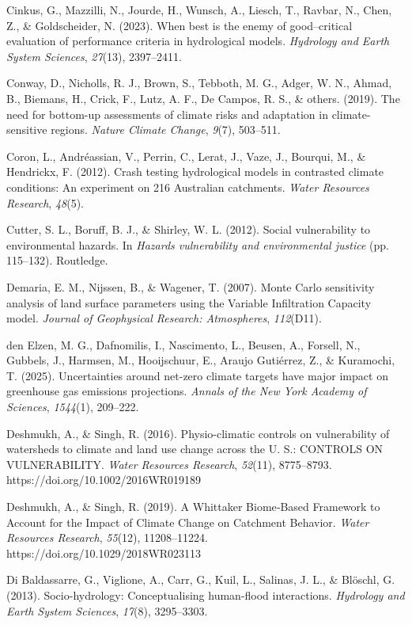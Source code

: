 \documentclass[
]{article}
\begin{document}
Cinkus, G., Mazzilli, N., Jourde, H., Wunsch, A., Liesch, T., Ravbar,
N., Chen, Z., \& Goldscheider, N. (2023). When best is the enemy of
good--critical evaluation of performance criteria in hydrological
models. \emph{Hydrology and Earth System Sciences}, \emph{27}(13),
2397--2411.

Conway, D., Nicholls, R. J., Brown, S., Tebboth, M. G., Adger, W. N.,
Ahmad, B., Biemans, H., Crick, F., Lutz, A. F., De Campos, R. S., \&
others. (2019). The need for bottom-up assessments of climate risks and
adaptation in climate-sensitive regions. \emph{Nature Climate Change},
\emph{9}(7), 503--511.

Coron, L., Andréassian, V., Perrin, C., Lerat, J., Vaze, J., Bourqui,
M., \& Hendrickx, F. (2012). Crash testing hydrological models in
contrasted climate conditions: An experiment on 216 Australian
catchments. \emph{Water Resources Research}, \emph{48}(5).

Cutter, S. L., Boruff, B. J., \& Shirley, W. L. (2012). Social
vulnerability to environmental hazards. In \emph{Hazards vulnerability
and environmental justice} (pp. 115--132). Routledge.

Demaria, E. M., Nijssen, B., \& Wagener, T. (2007). Monte Carlo
sensitivity analysis of land surface parameters using the Variable
Infiltration Capacity model. \emph{Journal of Geophysical Research:
Atmospheres}, \emph{112}(D11).

den Elzen, M. G., Dafnomilis, I., Nascimento, L., Beusen, A., Forsell,
N., Gubbels, J., Harmsen, M., Hooijschuur, E., Araujo Gutiérrez, Z., \&
Kuramochi, T. (2025). Uncertainties around net-zero climate targets have
major impact on greenhouse gas emissions projections. \emph{Annals of
the New York Academy of Sciences}, \emph{1544}(1), 209--222.

Deshmukh, A., \& Singh, R. (2016). Physio-climatic controls on
vulnerability of watersheds to climate and land use change across the U.
S.: CONTROLS ON VULNERABILITY. \emph{Water Resources Research},
\emph{52}(11), 8775--8793. https://doi.org/10.1002/2016WR019189

Deshmukh, A., \& Singh, R. (2019). A Whittaker Biome‐Based Framework to
Account for the Impact of Climate Change on Catchment Behavior.
\emph{Water Resources Research}, \emph{55}(12), 11208--11224.
https://doi.org/10.1029/2018WR023113

Di Baldassarre, G., Viglione, A., Carr, G., Kuil, L., Salinas, J. L., \&
Blöschl, G. (2013). Socio-hydrology: Conceptualising human-flood
interactions. \emph{Hydrology and Earth System Sciences}, \emph{17}(8),
3295--3303.
\end{document}
